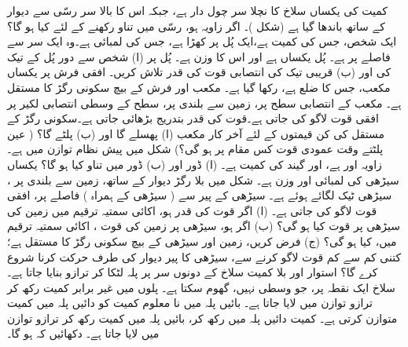 کمیت   کی یکساں سلاخ کا نچلا سر چول دار ہے، جبکہ اس کا بالا سر رسّی سے دیوار کے ساتھ باندھا گیا ہے (شکل )۔  اگر زاویہ  ہو، رسّی میں تناو  رکھنے کے لئے  کیا ہو گا؟
ایک شخص، جس کی کمیت  ہے،ایک پُل پر کھڑا ہے، جس کی لمبائی    ہے۔وہ ایک سر سے  فاصلے پر ہے۔ پُل یکساں ہے اور اس کا وزن  ہے۔ پُل پر (ا) شخص سے دور  پُل کے تیک کی اور (ب) قریبی تیک کی انتصابی  قوت کی قدر تلاش کریں۔
افقی فرش پر یکساں مکعب، جس کا ضلع  ہے، رکھا گیا ہے۔ مکعب اور فرش کے بیچ سکونی رگڑ کا مستقل  ہے۔ مکعب کے انتصابی  سطح پر، زمین سے  بلندی پر، سطح کے  وسطی انتصابی لکیر پر افقی قوت  لاگو کی جاتی ہے۔قوت کی قدر بتدریج بڑھائی جاتی ہے۔سکونی رگڑ کے مستقل  کی کن قیمتوں  کے لئے    آخر کار  مکعب (ا) پھسلے گا اور (ب) پلٹے گا؟ ( عین پلٹتے وقت عمودی قوت کس مقام پر ہو گی؟)
شکل  میں پیش نظام توازن میں ہے۔ زاویہ  اور  ہے، اور گیند کی کمیت  ہے۔ (ا) ڈور  اور (ب) ڈور   میں تناو کیا ہو گا؟
یکساں سیڑھی کی لمبائی  اور وزن  ہے۔ شکل  میں  بلا رگڑ دیوار کے ساتھ، زمین سے  بلندی پر ، سیڑھی ٹیک لگائے ہوئے ہے۔ سیڑھی کے پیر سے ( سیڑھی کے ہمراہ )  فاصلے پر، افقی قوت  لاگو کی جاتی ہے۔ (ا)  اگر قوت کی قدر  ہو، اکائی سمتیہ ترقیم میں زمین کی سیڑھی پر قوت کیا ہو گی؟ 
(ب) اگر  ہو، سیڑھی پر زمین کی قوت ، اکائی سمتیہ ترقیم میں، کیا ہو گی؟ (ج) فرض کریں، زمین اور سیڑھی کے بیچ سکونی رگڑ کا مستقل  ہے؛  کتنی کم سے کم قوت    لاگو کرنے سے، سیڑھی کا پیر دیوار کی طرف    حرکت کرنا شروع کرے گا؟
استوار اور بلا کمیت سلاخ کے دونوں سر پر پلہ  لٹکا کر ترازو بنایا جاتا ہے۔ سلاخ ایک نقطہ پر، جو وسطی نہیں، گھوم سکتا ہے۔ پلوں میں غیر برابر کمیت رکھ کر ترازو توازن میں لایا جاتا ہے۔ بائیں پلہ میں نا معلوم کمیت    کو دائیں پلہ میں کمیت  متوازن کرتی ہے۔ کمیت  دائیں  پلہ میں رکھ کر، بائیں پلہ میں کمیت  رکھ کر ترازو توازن میں  لایا جاتا ہے۔ دکھائیں کہ  ہو گا۔
